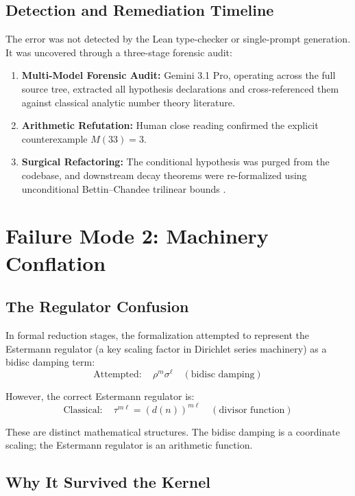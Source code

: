 \documentclass[11pt,a4paper]{article}
\theoremstyle{definition}
\theoremstyle{remark}
\begin{document}
\subsection{Detection and Remediation Timeline}

The error was not detected by the Lean type-checker or single-prompt generation. It was uncovered through a three-stage forensic audit:
\begin{enumerate}[label=(\roman*)]
  \item \textbf{Multi-Model Forensic Audit:} Gemini 3.1 Pro, operating across the full source tree, extracted all hypothesis declarations and cross-referenced them against classical analytic number theory literature.
  \item \textbf{Arithmetic Refutation:} Human close reading confirmed the explicit counterexample $M(33) = 3$.
  \item \textbf{Surgical Refactoring:} The conditional hypothesis was purged from the codebase, and downstream decay theorems were re-formalized using unconditional Bettin--Chandee trilinear bounds \cite{BettinChandee2015}.
\end{enumerate}

\section{Failure Mode 2: Machinery Conflation}
\label{sec:failure2}

\subsection{The Regulator Confusion}

In formal reduction stages, the formalization attempted to represent the Estermann regulator (a key scaling factor in Dirichlet series machinery) as a bidisc damping term:
\[
\text{Attempted}: \quad \rho^m \sigma^\ell \quad (\text{bidisc damping})
\]

However, the correct Estermann regulator is:
\[
\text{Classical}: \quad \tau^{m\ell} = (d(n))^{m\ell} \quad (\text{divisor function})
\]

These are distinct mathematical structures. The bidisc damping is a coordinate scaling; the Estermann regulator is an arithmetic function.

\subsection{Why It Survived the Kernel}
\end{document}
